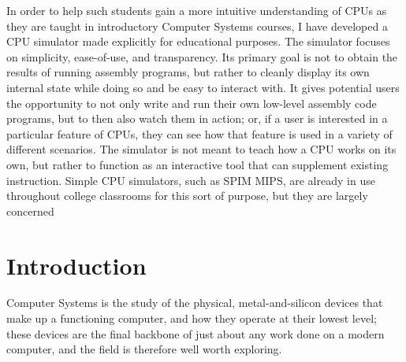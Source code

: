 \documentclass[12pt,twoside]{reedthesis}
\begin{document}
In order to help such students gain a more intuitive understanding of CPUs as they are taught in introductory Computer Systems courses, I have developed a CPU simulator made explicitly for educational purposes.
The simulator focuses on simplicity, ease-of-use, and transparency. Its primary goal is not to obtain the results of running assembly programs, but rather to cleanly display its own internal state while doing so and be easy to interact with.
It gives potential users the opportunity to not only write and run their own low-level assembly code programs, but to then also watch them in action; or, if a user is interested in a particular feature of CPUs, they can see how that feature is used in a variety of different scenarios. The simulator is not meant to teach how a CPU works on its own, but rather to function as an interactive tool that can supplement existing instruction.
Simple CPU simulators, such as SPIM MIPS, are already in use throughout college classrooms for this sort of purpose, but they are largely concerned


\mainmatter %
\pagestyle{fancyplain} %


\chapter*{Introduction}


Computer Systems is the study of the physical, metal-and-silicon devices that make up a functioning computer, and how they operate at their lowest level; these devices are the final backbone of just about any work done on a modern computer, and the field is therefore well worth exploring.
\end{document}
